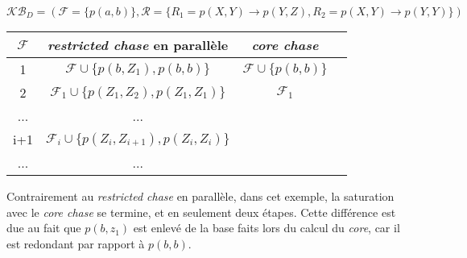 \begin{example}
$\mathcal{KB}_D = (\mathcal{F} = \{p(a,b)\}, \mathcal{R} = \{R_1 = p(X,Y) \rightarrow p(Y,Z) , R_2 = p(X,Y) \rightarrow p(Y,Y) \})$

\begin{center}
\begin{tabular}{|c|c|c|c|}
    \hline
    $\mathcal{F}$ & \textit{restricted chase} en parallèle & \textit{core chase} \\ 
    \hline
    1 &  $\mathcal{F} \cup \{p(b, Z_1), p(b,b)\} $ & $\mathcal{F} \cup \{ p(b,b)\}$\\ 
    \hline
    2 &$\mathcal{F}_1 \cup \{p(Z_1, Z_2), p(Z_1, Z_1)\}$ & $\mathcal{F}_1$ \\
    \hline
    ... & ... & \\
    \hline
    i+1 &  $\mathcal{F}_i \cup \{p(Z_{i}, Z_{i+1}), p(Z_{i}, Z_{i})\} $  & \\
     \hline
     ... &  ...  & \\
     \hline
\end{tabular}
\end{center}
\end{example}

Contrairement au \textit{restricted chase} en parallèle, dans cet exemple, la saturation avec le \textit{core chase} se termine, et en seulement deux étapes. Cette différence est due au fait que $p(b, z_1)$ est enlevé de la base faits lors du calcul du \textit{core}, car il est redondant par rapport à $p(b, b)$.


